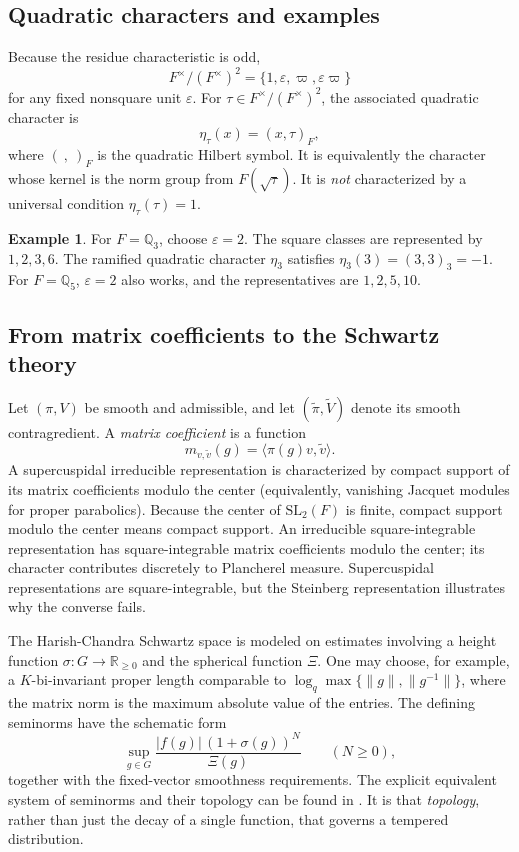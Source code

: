 \documentclass[12pt,letterpaper]{amsart}
\numberwithin{equation}{section}
\theoremstyle{definition}
\newtheorem{example}[theorem]{Example}
\theoremstyle{remark}
\begin{document}
\subsection{Quadratic characters and examples}\label{sec:quad}
Because the residue characteristic is odd,
\begin{equation}\label{eq:squareclasses}
F^\times/(F^\times)^2=\{1,\varepsilon,\varpi,\varepsilon\varpi\}
\end{equation}
for any fixed nonsquare unit $\varepsilon$.  For $\tau\in F^\times/(F^\times)^2$, the associated quadratic character is
\begin{equation}\label{eq:hilbert}
\eta_\tau(x)=(x,\tau)_F,
\end{equation}
where $(\ ,\ )_F$ is the quadratic Hilbert symbol.  It is equivalently the character whose kernel is the norm group from $F(\sqrt\tau)$.  It is \emph{not} characterized by a universal condition $\eta_\tau(\tau)=1$.
\begin{example}
For $F=\mathbb Q_3$, choose $\varepsilon=2$. The square classes are represented by $1,2,3,6$.  The ramified quadratic character $\eta_3$ satisfies
$\eta_3(3)=(3,3)_3=-1$.  For $F=\mathbb Q_5$, $\varepsilon=2$ also works, and the representatives are $1,2,5,10$.
\end{example}


\subsection{From matrix coefficients to the Schwartz theory}
Let $(\pi,V)$ be smooth and admissible, and let $(\widetilde\pi,\widetilde V)$ denote its smooth contragredient.  A \emph{matrix coefficient} is a function
\[
m_{v,\widetilde v}(g)=\langle\pi(g)v,\widetilde v\rangle.
\]
A supercuspidal irreducible representation is characterized by compact support of its matrix coefficients modulo the center (equivalently, vanishing Jacquet modules for proper parabolics). Because the center of $\mathrm{SL}_2(F)$ is finite, compact support modulo the center means compact support.  An irreducible square-integrable representation has square-integrable matrix coefficients modulo the center; its character contributes discretely to Plancherel measure.  Supercuspidal representations are square-integrable, but the Steinberg representation illustrates why the converse fails.

The Harish-Chandra Schwartz space is modeled on estimates involving a height function $\sigma:G\to\mathbb R_{\ge0}$ and the spherical function $\Xi$.  One may choose, for example, a $K$-bi-invariant proper length comparable to
$\log_q\max\{\|g\|,\|g^{-1}\|\}$, where the matrix norm is the maximum absolute value of the entries. The defining seminorms have the schematic form
\[
\sup_{g\in G}\frac{|f(g)|\,(1+\sigma(g))^N}{\Xi(g)}
\qquad(N\ge0),
\]
together with the fixed-vector smoothness requirements.  The explicit equivalent system of seminorms and their topology can be found in \cite{Si79,Cl91}. It is that \emph{topology}, rather than just the decay of a single function, that governs a tempered distribution.
\end{document}
